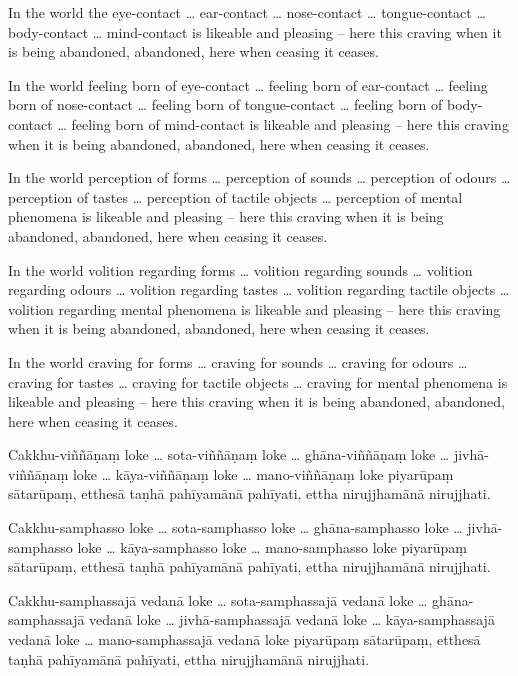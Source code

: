 In the world the eye-contact \ldots{} ear-contact \ldots{} nose-contact \ldots{}
tongue-contact \ldots{} body-contact \ldots{} mind-contact is likeable and
pleasing -- here this craving when it is being abandoned, abandoned, here when
ceasing it ceases.

In the world feeling born of eye-contact \ldots{} feeling born of ear-contact
\ldots{} feeling born of nose-contact \ldots{} feeling born of tongue-contact
\ldots{} feeling born of body-contact \ldots{} feeling born of mind-contact is
likeable and pleasing -- here this craving when it is being abandoned, abandoned,
here when ceasing it ceases.

In the world perception of forms \ldots{} perception of sounds \ldots{}
perception of odours \ldots{} perception of tastes \ldots{} perception of
tactile objects \ldots{} perception of mental phenomena is likeable and pleasing
-- here this craving when it is being abandoned, abandoned, here when ceasing it
ceases.

In the world volition regarding forms \ldots{} volition regarding sounds
\ldots{} volition regarding odours \ldots{} volition regarding tastes \ldots{}
volition regarding tactile objects \ldots{} volition regarding mental phenomena
is likeable and pleasing -- here this craving when it is being abandoned,
abandoned, here when ceasing it ceases.

In the world craving for forms \ldots{} craving for sounds \ldots{} craving for
odours \ldots{} craving for tastes \ldots{} craving for tactile objects \ldots{}
craving for mental phenomena is likeable and pleasing -- here this craving when
it is being abandoned, abandoned, here when ceasing it ceases.

\paliPage

Cakkhu-viññāṇaṃ loke \ldots{} sota-viññāṇaṃ loke \ldots{} ghāna-viññāṇaṃ loke
\ldots{} jivhā-viññāṇaṃ loke \ldots{} kāya-viññāṇaṃ loke \ldots{} mano-viññāṇaṃ
loke piyarūpaṃ sātarūpaṃ, etthesā taṇhā pahīyamānā pahīyati, ettha nirujjhamānā
nirujjhati.

Cakkhu-samphasso loke \ldots{} sota-samphasso loke \ldots{} ghāna-samphasso loke
\ldots{} jivhā-samphasso loke \ldots{} kāya-samphasso loke \ldots{} mano-samphasso
loke piyarūpaṃ sātarūpaṃ, etthesā taṇhā pahīyamānā pahīyati, ettha nirujjhamānā
nirujjhati.

Cakkhu-samphassajā vedanā loke \ldots{} sota-samphassajā vedanā loke \ldots{}
ghāna-samphassajā vedanā loke \ldots{} jivhā-samphassajā vedanā loke \ldots{}
kāya-samphassajā vedanā loke \ldots{} mano-samphassajā vedanā loke piyarūpaṃ
sātarūpaṃ, etthesā taṇhā pahīyamānā pahīyati, ettha nirujjhamānā nirujjhati.

